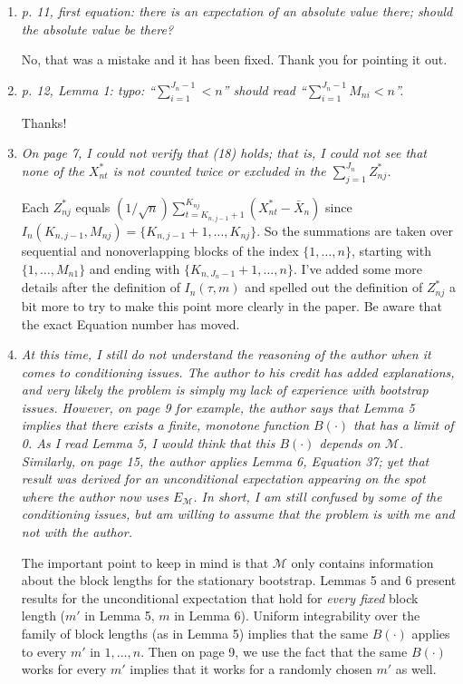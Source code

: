 \documentclass[12pt]{article}
\begin{document}
\begin{enumerate}
\item \textit{p. 11, first equation: there is an expectation of an
    absolute value there; should the absolute value be there?}

  No, that was a mistake and it has been fixed. Thank you for pointing
  it out.

\item \textit{p. 12, Lemma 1: typo: ``$\sum_{i=1}^{J_n-1} < n$'' should read
  ``$\sum_{i=1}^{J_n-1} M_{ni} < n$''.}

  Thanks!

\item \textit{On page 7, I could not verify that (18) holds; that is,
    I could not see that none of the $X_{nt}^*$ is not counted twice
    or excluded in the $\sum_{j=1}^{J_n} Z_{nj}^*$.}

  Each $Z_{nj}^*$ equals $(1/\sqrt{n}) \sum_{t=K_{n,j-1}+1}^{K_{nj}}
  (X_{nt}^* - \bar X_n)$ since $I_n(K_{n,j-1}, M_{nj}) =
  \{K_{n,j-1}+1,\dots,K_{nj}\}$. So the summations are taken over
  sequential and nonoverlapping blocks of the index $\{1,\dots,n\}$,
  starting with $\{1,\dots,M_{n1}\}$ and ending with
  $\{K_{n,J_n-1}+1,\dots,n\}$.  I've added some more details after the
  definition of $I_n(\tau,m)$ and spelled out the
  definition of $Z_{nj}^*$ a bit more to try to make
  this point more clearly in the paper. Be aware that the exact
  Equation number has moved.

\item \textit{At this time, I still do not understand the reasoning of
    the author when it comes to conditioning issues. The author to his
    credit has added explanations, and very likely the problem is
    simply my lack of experience with bootstrap issues. However, on
    page 9 for example, the author says that Lemma 5 implies that
    there exists a finite, monotone function $B(\cdot)$ that has a
    limit of 0. As I read Lemma 5, I would think that this $B(\cdot)$
    depends on $\mathcal{M}$. Similarly, on page 15, the author
    applies Lemma 6, Equation 37; yet that result was derived for an
    unconditional expectation appearing on the spot where the author
    now uses $E_{\mathcal{M}}$. In short, I am still confused by some
    of the conditioning issues, but am willing to assume that the
    problem is with me and not with the author.}

  The important point to keep in mind is that $\mathcal{M}$ only
  contains information about the block lengths for the stationary
  bootstrap. Lemmas 5 and 6 present results for the unconditional
  expectation that hold for \emph{every fixed} block length ($m'$ in
  Lemma 5, $m$ in Lemma 6). Uniform integrability over the family of
  block lengths (as in Lemma 5) implies that the same $B(\cdot)$
  applies to every $m'$ in $1,\dots,n$. Then on page 9, we use the
  fact that the same $B(\cdot)$ works for every $m'$ implies that it
  works for a randomly chosen $m'$ as well.


\end{enumerate}
\end{document}
